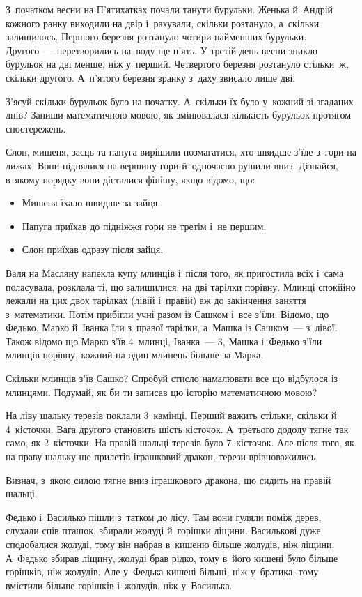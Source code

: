 \problem
З~початком весни на П'ятихатках почали танути бурульки.
Женька й~Андрій кожного ранку виходили на двір і~рахували, скільки розтануло,
а~скільки залишилось.
Першого березня розтануло чотири найменших бурульки.
Другого~--- перетворились на~воду ще п'ять.
У третій день весни зникло бурульок на дві менше, ніж у~перший.
Четвертого березня розтануло стільки~ж, скільки другого.
А~п'ятого березня зранку з~даху звисало лише дві.

З'ясуй скільки бурульок було на початку.
А~скільки їх було у~кожний зі згаданих днів?
Запиши математичною мовою, як змінювалася кількість бурульок
протягом спостережень.


\problem
Слон, мишеня, заєць та папуга вирішили позмагатися, хто швидше з'їде
з~гори на лижах. Вони піднялися на вершину гори й~одночасно рушили вниз.
Дізнайся, в~якому порядку вони дісталися фінішу, якщо відомо, що:
\begin{itemize}
  \item Мишеня їхало швидше за зайця.
  \item Папуга приїхав до підніжжя гори не третім і~не першим.
  \item Слон приїхав одразу після зайця.
\end{itemize}


\problem
Валя на Масляну напекла купу млинців і~після того, як пригостила всіх
і~сама поласувала, розклала ті, що залишилися, на дві тарілки порівну.
Млинці спокійно лежали на цих двох тарілках (лівій і~правій)
аж до закінчення заняття з~математики.
Потім прибігли учні разом із Сашком і~все з'їли.
Відомо, що Федько, Марко й~Іванка їли з~правої тарілки,
а~Машка із Сашком~--- з~лівої.
Також відомо що Марко з'їв 4~млинці, Іванка~--- 3,
Машка і~Федько з'їли млинців порівну, кожний на один млинець більше за Марка.

Скільки млинців з'їв Сашко?
Спробуй стисло намалювати все що відбулося із млинцями.
Подумай, як би ти записав цю історію математичною мовою?


\problem
На ліву шальку терезів поклали 3~камінці.
Перший важить стільки, скільки й 4~кісточки.
Вага другого становить шість кісточок.
А~третього додолу тягне так само, як 2~кісточки.
На правій шальці терезів було 7~кісточок.
Але після того, як на праву шальку ще прилетів іграшковий дракон,
терези врівноважились.

Визнач, з~якою силою тягне вниз іграшкового дракона,
що сидить на правій шальці.


\problem
Федько і~Василько пішли з~татком до лісу.
Там вони гуляли поміж дерев, слухали спів пташок,
збирали жолуді й~горішки ліщини.
Василькові дуже сподобалися жолуді, тому він набрав в~кишеню більше
жолудів, ніж ліщини. А~Федько збирав ліщину, жолуді брав рідко,
тому в~його кишені було більше горішків, ніж жолудів.
Але у~Федька кишені більші, ніж у~братика, тому вмістили
більше горішків і~жолудів, ніж у~Василька.


